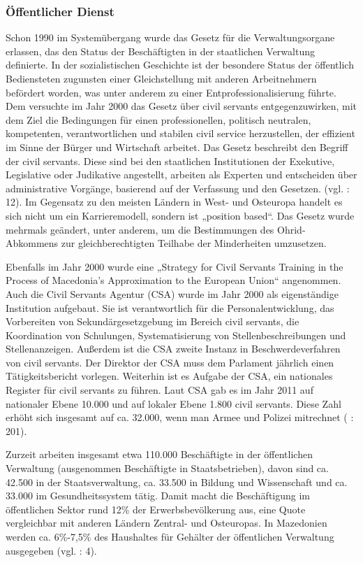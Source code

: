 \subsubsection{Öffentlicher Dienst}
Schon 1990 im Systemübergang wurde das Gesetz für die Verwaltungsorgane erlassen, das den Status der Beschäftigten in der staatlichen Verwaltung definierte. In der sozialistischen Geschichte ist der besondere Status der öffentlich Bediensteten zugunsten einer Gleichstellung mit anderen Arbeitnehmern befördert worden, was unter anderem zu einer Entprofessionalisierung führte. Dem versuchte im Jahr 2000 das Gesetz über civil servants entgegenzuwirken, mit dem Ziel die Bedingungen für einen professionellen, politisch neutralen, kompetenten, verantwortlichen und stabilen civil service herzustellen, der effizient im Sinne der Bürger und Wirtschaft arbeitet. Das Gesetz beschreibt den Begriff der civil servants. Diese sind bei den staatlichen Institutionen der Exekutive, Legislative oder Judikative angestellt, arbeiten als Experten und entscheiden über administrative Vorgänge, basierend auf der Verfassung und den Gesetzen. (vgl. \cite{markic} : 12). Im Gegensatz zu den meisten Ländern in West- und Osteuropa handelt es sich nicht um ein Karrieremodell, sondern ist „position based“. Das Gesetz wurde mehrmals geändert, unter anderem, um die Bestimmungen des Ohrid-Abkommens zur gleichberechtigten Teilhabe der Minderheiten umzusetzen. \par
Ebenfalls im Jahr 2000 wurde eine  „Strategy for Civil Servants Training in the Process of Macedonia's Approximation to the European Union“ angenommen. Auch die Civil Servants Agentur (CSA) wurde im Jahr 2000 als eigenständige Institution aufgebaut. Sie ist verantwortlich für die Personalentwicklung, das Vorbereiten von Sekundärgesetzgebung im Bereich civil servants, die Koordination von Schulungen, Systematisierung von Stellenbeschreibungen und Stellenanzeigen. Außerdem ist die CSA zweite Instanz in Beschwerdeverfahren von civil servants. Der Direktor der CSA muss dem Parlament jährlich einen Tätigkeitsbericht vorlegen. Weiterhin ist es Aufgabe der CSA, ein nationales Register für civil servants zu führen. Laut CSA gab es im Jahr 2011 auf nationaler Ebene 10.000 und auf lokaler Ebene 1.800 civil servants. Diese Zahl erhöht sich insgesamt auf ca. 32.000, wenn man Armee und Polizei mitrechnet (\cite{repofmac04} : 201). \par
Zurzeit arbeiten insgesamt etwa 110.000 Beschäftigte in der öffentlichen Verwaltung (ausgenommen Beschäftigte in Staatsbetrieben), davon sind ca. 42.500 in der Staatsverwaltung, ca. 33.500 in Bildung und Wissenschaft und ca. 33.000 im Gesundheitssystem tätig. Damit macht die Beschäftigung im öffentlichen Sektor rund 12\% der Erwerbsbevölkerung aus, eine Quote vergleichbar mit anderen Ländern Zentral- und Osteuropas. In Mazedonien werden ca. 6\%-7,5\% des Haushaltes für Gehälter der öffentlichen Verwaltung ausgegeben (vgl. \cite{analyt09} : 4).\par
